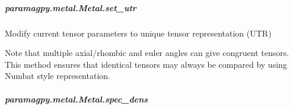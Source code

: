 \documentclass[a4paper,10pt,english,openany,oneside]{sphinxmanual}
\begin{document}
\begin{fulllineitems}
\begin{fulllineitems}
\begin{fulllineitems}
%
\begin{sphinxVerbatim}[commandchars=\\\{\}]
  
\PYG{p}{[}\PYG{p}{]}
\end{sphinxVerbatim}

\end{fulllineitems}



\subparagraph{paramagpy.metal.Metal.set\_utr}
\label{\detokenize{reference/generated/paramagpy.metal.Metal.set_utr:paramagpy-metal-metal-set-utr}}\label{\detokenize{reference/generated/paramagpy.metal.Metal.set_utr::doc}}

\begin{fulllineitems}
\label{\detokenize{reference/generated/paramagpy.metal.Metal.set_utr:paramagpy.metal.Metal.set_utr}}
Modify current tensor parameters to unique tensor representation (UTR)

Note that multiple axial/rhombic and euler angles can give congruent
tensors.
This method ensures that identical tensors may always be compared
by using Numbat style representation.

\end{fulllineitems}



\subparagraph{paramagpy.metal.Metal.spec\_dens}
\label{\detokenize{reference/generated/paramagpy.metal.Metal.spec_dens:paramagpy-metal-metal-spec-dens}}\label{\detokenize{reference/generated/paramagpy.metal.Metal.spec_dens::doc}}


\end{fulllineitems}
\end{fulllineitems}
\end{document}
